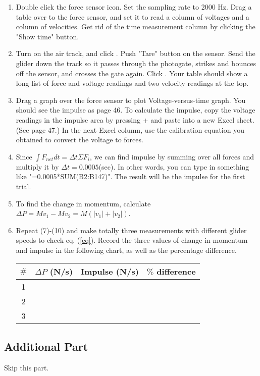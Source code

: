 \documentclass{article}
\begin{document}
\begin{enumerate}
\item Double click the force sensor icon. Set the sampling rate to 2000 Hz. Drag a table over to the force sensor, and set it to read a column of voltages and a column of velocities. Get rid of the time measurement column by clicking the "Show time" button.

\item Turn on the air track, and click . Push "Tare" button on the sensor. Send the glider down the track so it passes through the photogate, strikes and bounces off the sensor, and crosses the gate again. Click . Your table should show a long list of force and voltage readings and two velocity readings at the top. 

\item Drag a graph over the force sensor to plot Voltage-versus-time graph. You should see the impulse as page 46. To calculate the impulse, copy the voltage readings in the impulse area by pressing + and paste into a new Excel sheet. (See page 47.) In the next Excel column, use the calibration equation you obtained to convert the voltage to forces. 

\item Since $\int F_{net} dt=\Delta t \Sigma F_i$, we can find impulse by summing over all forces and multiply it by $\Delta t=0.0005$(sec). In other words, you can type in something like "=0.0005*SUM(B2:B147)". The result will be the impulse for the first trial.

\item To find the change in momentum, calculate $\Delta P =M v_1-M v_2=M(|v_1|+|v_2|)$.

\item Repeat (7)-(10) and make totally three measurements with different glider speeds to check eq. (\ref{eq}). Record the three values of change in momentum and impulse in the following chart, as well as the percentage difference. 

\begin{tabular}{|c|c|c|c|}
\hline
$\#$ & $\Delta P$ (N/s)  & Impulse (N/s) & $\%$ difference \\
\hline
1   &   &   & \\
\hline
2   &   &   & \\
\hline
3  &   &   & \\
\hline
\end{tabular}


\end{enumerate}

\subsection*{Additional Part}
Skip this part.
\end{document}
